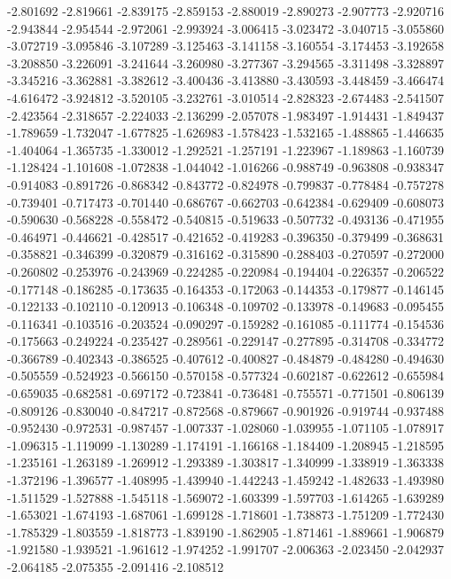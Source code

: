 -2.801692
-2.819661
-2.839175
-2.859153
-2.880019
-2.890273
-2.907773
-2.920716
-2.943844
-2.954544
-2.972061
-2.993924
-3.006415
-3.023472
-3.040715
-3.055860
-3.072719
-3.095846
-3.107289
-3.125463
-3.141158
-3.160554
-3.174453
-3.192658
-3.208850
-3.226091
-3.241644
-3.260980
-3.277367
-3.294565
-3.311498
-3.328897
-3.345216
-3.362881
-3.382612
-3.400436
-3.413880
-3.430593
-3.448459
-3.466474
-4.616472
-3.924812
-3.520105
-3.232761
-3.010514
-2.828323
-2.674483
-2.541507
-2.423564
-2.318657
-2.224033
-2.136299
-2.057078
-1.983497
-1.914431
-1.849437
-1.789659
-1.732047
-1.677825
-1.626983
-1.578423
-1.532165
-1.488865
-1.446635
-1.404064
-1.365735
-1.330012
-1.292521
-1.257191
-1.223967
-1.189863
-1.160739
-1.128424
-1.101608
-1.072838
-1.044042
-1.016266
-0.988749
-0.963808
-0.938347
-0.914083
-0.891726
-0.868342
-0.843772
-0.824978
-0.799837
-0.778484
-0.757278
-0.739401
-0.717473
-0.701440
-0.686767
-0.662703
-0.642384
-0.629409
-0.608073
-0.590630
-0.568228
-0.558472
-0.540815
-0.519633
-0.507732
-0.493136
-0.471955
-0.464971
-0.446621
-0.428517
-0.421652
-0.419283
-0.396350
-0.379499
-0.368631
-0.358821
-0.346399
-0.320879
-0.316162
-0.315890
-0.288403
-0.270597
-0.272000
-0.260802
-0.253976
-0.243969
-0.224285
-0.220984
-0.194404
-0.226357
-0.206522
-0.177148
-0.186285
-0.173635
-0.164353
-0.172063
-0.144353
-0.179877
-0.146145
-0.122133
-0.102110
-0.120913
-0.106348
-0.109702
-0.133978
-0.149683
-0.095455
-0.116341
-0.103516
-0.203524
-0.090297
-0.159282
-0.161085
-0.111774
-0.154536
-0.175663
-0.249224
-0.235427
-0.289561
-0.229147
-0.277895
-0.314708
-0.334772
-0.366789
-0.402343
-0.386525
-0.407612
-0.400827
-0.484879
-0.484280
-0.494630
-0.505559
-0.524923
-0.566150
-0.570158
-0.577324
-0.602187
-0.622612
-0.655984
-0.659035
-0.682581
-0.697172
-0.723841
-0.736481
-0.755571
-0.771501
-0.806139
-0.809126
-0.830040
-0.847217
-0.872568
-0.879667
-0.901926
-0.919744
-0.937488
-0.952430
-0.972531
-0.987457
-1.007337
-1.028060
-1.039955
-1.071105
-1.078917
-1.096315
-1.119099
-1.130289
-1.174191
-1.166168
-1.184409
-1.208945
-1.218595
-1.235161
-1.263189
-1.269912
-1.293389
-1.303817
-1.340999
-1.338919
-1.363338
-1.372196
-1.396577
-1.408995
-1.439940
-1.442243
-1.459242
-1.482633
-1.493980
-1.511529
-1.527888
-1.545118
-1.569072
-1.603399
-1.597703
-1.614265
-1.639289
-1.653021
-1.674193
-1.687061
-1.699128
-1.718601
-1.738873
-1.751209
-1.772430
-1.785329
-1.803559
-1.818773
-1.839190
-1.862905
-1.871461
-1.889661
-1.906879
-1.921580
-1.939521
-1.961612
-1.974252
-1.991707
-2.006363
-2.023450
-2.042937
-2.064185
-2.075355
-2.091416
-2.108512

